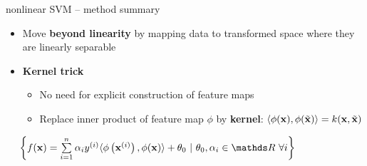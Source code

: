\begin{frame}{nonlinear SVM -- method summary}

\footnotesize

   

\medskip

\begin{itemize}
  \item Move \textbf{beyond linearity} by mapping data to 
  transformed space where they are linearly separable
  \item \textbf{Kernel trick} %
  \begin{itemize}
    \item No need for explicit construction of feature maps
    \item Replace inner product of feature map $\phi$ by \textbf{kernel}: $\left\langle \phi(\mathbf{x}), \phi(\tilde {\mathbf{x}}) \right\rangle = k(\mathbf{x}, \tilde {\mathbf{x}})$
  \end{itemize}
\end{itemize}

\medskip


 ~~
$\left \{ \fx = \sumin \alpha_i \yi \langle \phi \left( \xi \right), 
    \phi(\xv) \rangle  + 
    \theta_0 ~|~ \theta_0, \alpha_i \in \R ~ \forall i \right \}$


\end{frame}
